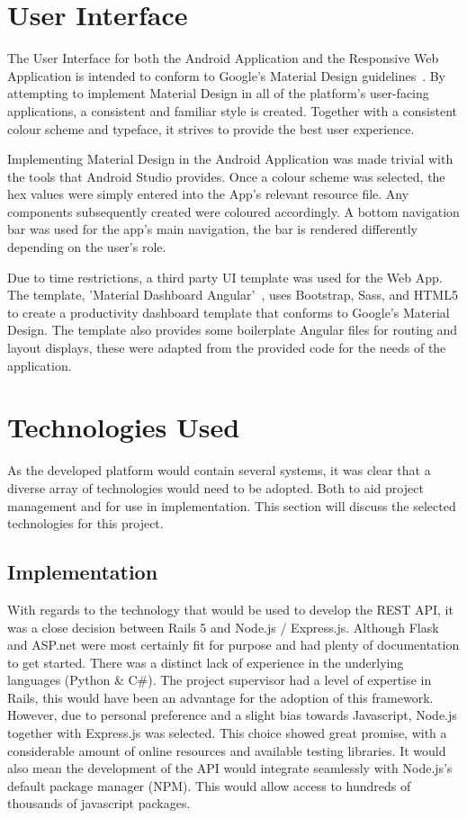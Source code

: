 \section{User Interface}
The User Interface for both the Android Application and the Responsive Web Application is intended to conform to Google's Material Design guidelines~\cite{material_documentation_ref}. By attempting to implement Material Design in all of the platform's user-facing applications, a consistent and familiar style is created. Together with a consistent colour scheme and typeface, it strives to provide the best user experience.

Implementing Material Design in the Android Application was made trivial with the tools that Android Studio provides. Once a colour scheme was selected, the hex values were simply entered into the App's relevant resource file. Any components subsequently created were coloured accordingly. A bottom navigation bar was used for the app's main navigation, the bar is rendered differently depending on the user's role.

Due to time restrictions, a third party UI template was used for the Web App. The template, 'Material Dashboard Angular'~\cite{angular_material_documentation_ref}, uses Bootstrap, Sass, and HTML5 to create a productivity dashboard template that conforms to Google's Material Design. The template also provides some boilerplate Angular files for routing and layout displays, these were adapted from the provided code for the needs of the application.

\section{Technologies Used}
As the developed platform would contain several systems, it was clear that a diverse array of technologies would need to be adopted. Both to aid project management and for use in implementation. This section will discuss the selected technologies for this project.

\subsection{Implementation}
With regards to the technology that would be used to develop the REST API, it was a close decision between Rails 5 and Node.js / Express.js. Although Flask and ASP.net were most certainly fit for purpose and had plenty of documentation to get started. There was a distinct lack of experience in the underlying languages (Python \& C\#). The project supervisor had a level of expertise in Rails, this would have been an advantage for the adoption of this framework. However, due to personal preference and a slight bias towards Javascript, Node.js together with Express.js was selected. This choice showed great promise, with a considerable amount of online resources and available testing libraries. It would also mean the development of the API would integrate seamlessly with Node.js's default package manager (NPM). This would allow access to hundreds of thousands of javascript packages.

